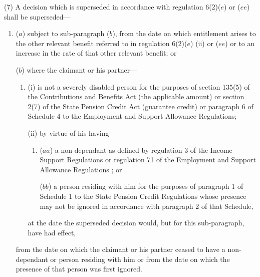 \documentclass[12pt,a4paper]{article}
\begin{document}



(7) A decision which is superseded in accordance with regulation 6(2)($e$)  or ($ee$)  shall be superseded—
\begin{enumerate}\item[]
($a$) subject to sub-paragraph ($b$), from the date on which entitlement arises to the other relevant benefit referred to in regulation 6(2)($e$) (ii)  or ($ee$)  or to an increase in the rate of that other relevant benefit; or

($b$) where the claimant or his partner—
\begin{enumerate}\item[]
(i) is not a severely disabled person for the purposes of section 135(5) of the Contributions and Benefits Act (the applicable amount) or section 2(7) of the State Pension Credit Act (guarantee credit)
or paragraph 6 of Schedule 4 to the Employment and Support Allowance Regulations;  %

(ii) by virtue of his having—
\begin{enumerate}\item[]
($aa$) a non-dependant as defined by regulation 3 of the Income Support Regulations
or regulation 71 of the Employment and Support Allowance Regulations%
; or

($bb$) a person residing with him for the purposes of paragraph 1 of Schedule 1 to the State Pension Credit Regulations whose presence may not be ignored in accordance with paragraph 2 of that Schedule,
\end{enumerate}
at the date the superseded decision would, but for this sub-paragraph, have had effect,
\end{enumerate}
from the date on which the claimant or his partner ceased to have a non-dependant or person residing with him or from the date on which the presence of that person was first ignored.
\end{enumerate}
\end{document}
